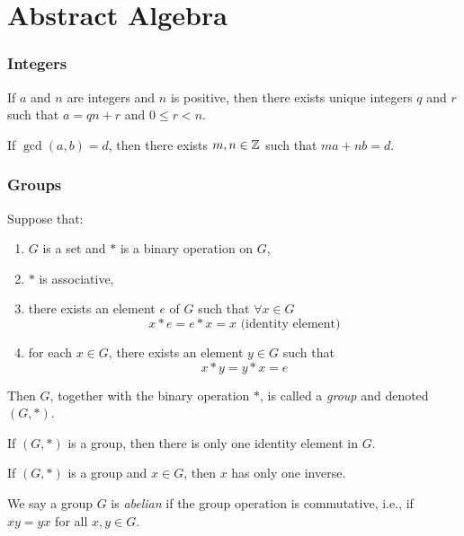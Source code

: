 \part*{Abstract Algebra}

\section*{Integers}

\begin{fact}
	If $a$ and $n$ are integers and $n$ is positive, then there exists unique
	integers $q$ and $r$ such that $a = qn + r$ and $0 \leq r < n$.
\end{fact}

\begin{fact}
	If $\gcd(a, b) = d$, then there exists $m, n \in {\mathbb{Z}}$ such that $ma + nb = d$.
\end{fact}

\section*{Groups}

\begin{definition}
	Suppose that:
	\begin{enumerate}
		\item $G$ is a set and $*$ is a binary operation on $G$,
		\item $*$ is associative,
		\item there exists an element $e$ of $G$ such that $\forall x \in G$ \[x
			* e = e * x = x \text{ (identity element)}\]
		\item for each $x \in G$, there exists an element $y \in G$ such that
			\[x * y = y * x = e\]
	\end{enumerate}
	Then $G$, together with the binary operation $*$, is called a
	\emph{group} and denoted $(G, *)$.
\end{definition}

\begin{theorem}
	If $(G, *)$ is a group, then there is only one identity element in $G$.
\end{theorem}

\begin{theorem}
	If $(G, *)$ is a group and $x \in G$, then $x$ has only one inverse.
\end{theorem}

\begin{definition}
	We say a group $G$ is \emph{abelian} if the group operation is commutative,
	i.e., if $xy = yx$ for all $x, y \in G$.
\end{definition}

